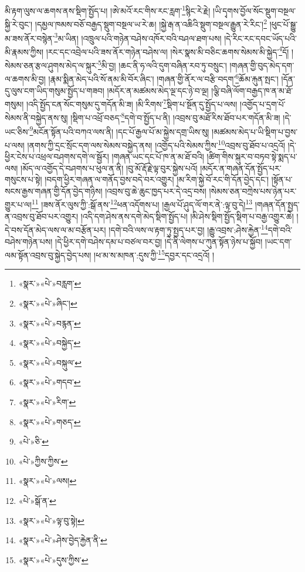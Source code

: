 མི་རྟག་ལུས་ལ་ཆགས་ནས་སྡིག་སྤྱོད་པ། །ཨེ་མའོ་རང་གིས་རང་རླག་\footnote{«སྣར་»«པེ་»བརླག་}སྙིང་རེ་རྗེ། །ཡི་དྭགས་བྱོལ་སོང་སྡུག་བསྔལ་སྐྱི་རེ་བུང་། །དམྱལ་ཁམས་བཅོ་བརྒྱད་སྡུག་བསྔལ་ཡ་རེ་ཆ། །སྐྱེ་རྒ་ན་འཆིའི་སྡུག་བསྔལ་རྒྱུན་རེ་རིང་།\footnote{«སྣར་»«པེ་»ཞིང་།} །ཕུང་པོ་སྒྱུ་མ་ཟས་ནོར་བསྙེན་\footnote{«སྣར་»«པེ་»བརྙན་}མ་ཡིན། །འཁྲུལ་པའི་གཉེན་བཤེས་འཁོར་བའི་བཤལ་ཐག་པས། །དེ་རིང་རང་དབང་ཡོད་པའི་མི་རྣམས་ཀྱིས། །རང་དང་འབྲེལ་པའི་ཟས་ནོར་གཉེན་བཤེས་ལ། །སེར་སྣས་མི་བཅིང་ཆགས་སེམས་མི་སྐྱེད་\footnote{«སྣར་»«པེ་»བསྐྱེད་}དོ། །སེམས་ཅན་རྩལ་ཤུགས་མེད་ལ་སྐུར་\footnote{«སྣར་»«པེ་»བསྐུལ་}མི་བྱ། །ཆང་ནི་ཧ་ལའི་དུག་བཞིན་རབ་ཏུ་བསྲུང་། །གཞན་གྱི་བུད་མེད་དག་ལ་ཆགས་མི་བྱ། །རྣམ་སྨིན་མེད་པའི་སོ་ནམ་མི་བོར་ཞིང་། །གཞན་གྱི་ནོར་ལ་བརྩི་བདག་\footnote{«སྣར་»«པེ་»གདབ་}ཆོམ་རྐུན་སྤང་། །དོན་དུ་ལུས་ངག་ཡིད་གསུམ་སྤྱོད་པ་གཟབ། །མདོར་ན་མཚམས་མེད་ལྔ་དང་ཉེ་བ་ལྔ། །ལྕི་བཞི་ལོག་བརྒྱད་ཁ་ན་མ་ཐོ་གསུམ། །འདི་སྤྱོད་ངན་སོང་གསུམ་དུ་གདོན་མི་ཟ། །མི་རིགས་\footnote{«སྣར་»«པེ་»རིག་}སྡིག་པ་སྔོན་དུ་སྤྱོད་པ་ལས། །འགྱོད་པ་དྲག་པོ་སེམས་ནི་བསྐྱེད་ནས་སུ། །སྡིག་པ་འཕྲོ་བཅད་\footnote{«སྣར་»«པེ་»གཅད་}དགེ་བ་སྤྱོད་པ་ནི། །འབྲས་བུ་མཐོ་རིས་ཐོབ་པར་གདོན་མི་ཟ། །དེ་ཡང་ཅིས་\footnote{«པེ་»ཅི་}མངོན་སྟོན་པའི་བཀའ་ལས་ནི། །དང་པོ་རྒྱལ་པོ་མ་སྐྱེས་དགྲ་ཡིས་སུ། །མཚམས་མེད་པ་ཡི་སྡིག་པ་བྱས་པ་ལས། །ནགས་ཀྱི་དྲང་སྲོང་དག་ལས་སེམས་བསྐྱེད་ནས། །འགྱོད་པའི་སེམས་ཀྱིས་\footnote{«པེ་»ཀྱིས་ཀྱིས་}འབྲས་བུ་ཐོབ་པ་འདྲའོ། །དེ་ཕྱིར་ངེས་པ་འཕྲལ་བཤགས་དགེ་ལ་སྦྱོར། །གཞན་ཡང་དང་པོ་ཁ་ན་མ་ཐོ་བའི། །ཚིག་གིས་སྐུར་བ་བཏབ་སྟེ་སྨད་པ་ལས། །མོད་ལ་འགྱོད་དེ་བཤགས་པ་ཕུལ་ན་ནི། །བུ་མོ་རྡོ་རྗེ་ལྟ་བུར་སྐྱེས་པའོ། །མདོར་ན་གཞན་དོན་སྤྱོད་པར་གསུངས་པ་སྟེ། །བདག་ཕྱིར་གཞན་ལ་གནོད་བྱས་བདེ་བར་འགྱུར། །མ་རིག་སྐྱེ་བོ་རང་གི་དོན་བྱེད་དང་། །སྟོན་པ་སངས་རྒྱས་གཞན་གྱི་དོན་བྱེད་གཉིས། །འབྲས་བུ་ཆེ་ཆུང་ཁྱད་པར་དེ་འདྲ་བས། །སེམས་ཅན་བཀྲེས་པས་ཉེན་པར་གྱུར་པ་ལ།\footnote{«སྣར་»«པེ་»ལས།} །ཟས་ནོར་ལུས་ཀྱི་:སྒོ་ནས་\footnote{«པེ་»སྒོ་ན་}ཕན་འདོགས་པ། །རྒྱལ་པོ་ཤུད་ལོ་གར་ནེ་:ལྟ་བུ་དེ།\footnote{«སྣར་»«པེ་»ལྟ་བུ་སྟེ།} །གཞན་དོན་སྤྱད་ན་འབྲས་བུ་ཐོབ་པར་འགྱུར། །འདི་དག་ཤེས་ནས་དགེ་མེད་སྡིག་སྤྱོད་པ། །མི་ཤེས་སྡིག་སྤྱོད་སྡིག་པ་བརྒྱ་འགྱུར་ཆེ། །དེ་བས་དོན་མེད་ལས་ལ་མ་བརྩོན་པར། །དགེ་བའི་ལས་ལ་རྟག་ཏུ་སྤྱད་པར་བྱ། །རྒྱུ་འབྲས་:ཤེས་རྐྱེན་\footnote{«སྣར་»«པེ་»ཤེས་བྱེད་རྐྱེན་ནི་}དགེ་བའི་བཤེས་གཉེན་པས། །དེ་ཕྱིར་དགེ་བཤེས་དམ་པ་བཙལ་བར་བྱ། །དེ་ནི་ལེགས་པ་ཀུན་སྟོན་ཉེས་པ་སྐྱོབ། །ཡང་དག་ལམ་སྟོན་འབྲས་བུ་སྐྱེད་བྱེད་པས། །ཕ་མ་ས་མཁན་:དུས་ཀྱི་\footnote{«སྣར་»«པེ་»དུས་ཀྱིས་}དབྱར་དང་འདྲའོ། །
